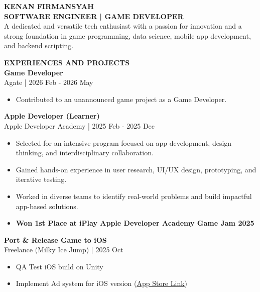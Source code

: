 \documentclass[11pt,a4paper]{article}
\newcommand{\mainsection}[1]{%
    {\large\bfseries\MakeUppercase{#1}}\\[8pt]%
}
\newcommand{\jobentry}[2]{%
    \textbf{#1}\\
    {\small\color{lighttext}#2}\\[4pt]%
}
\begin{document}
\begin{minipage}[t]{14cm}
\vspace{0.5cm}
\hspace{0.8cm}
\begin{minipage}[t]{12.5cm}

{\Huge\bfseries\MakeUppercase{Kenan Firmansyah}}\\[6pt]
{\large\bfseries SOFTWARE ENGINEER | GAME DEVELOPER}\\[12pt]

{\small A dedicated and versatile tech enthusiast with a passion for innovation and a strong foundation in game programming, data science, mobile app development, and backend scripting.}

\vspace{0.6cm}

\mainsection{Experiences and Projects}

\jobentry{Game Developer}{Agate | 2026 Feb - 2026 May}
\begin{itemize}[leftmargin=*, nosep, itemsep=2pt, topsep=2pt]
    \item Contributed to an unannounced game project as a Game Developer.
\end{itemize}

\vspace{0.5cm}

\jobentry{Apple Developer (Learner)}{Apple Developer Academy | 2025 Feb - 2025 Dec}
\begin{itemize}[leftmargin=*, nosep, itemsep=2pt, topsep=2pt]
    \item Selected for an intensive program focused on app development, design thinking, and interdisciplinary collaboration.
    \item Gained hands-on experience in user research, UI/UX design, prototyping, and iterative testing.
    \item Worked in diverse teams to identify real-world problems and build impactful app-based solutions.
    \item \textbf{Won 1st Place at iPlay Apple Developer Academy Game Jam 2025}
\end{itemize}

\vspace{0.5cm}

\jobentry{Port \& Release Game to iOS}{Freelance (Milky Ice Jump) | 2025 Oct}
\begin{itemize}[leftmargin=*, nosep, itemsep=2pt, topsep=2pt]
    \item QA Test iOS build on Unity
    \item Implement Ad system for iOS version (\href{https://apps.apple.com/id/app/milky-ice-jump/id6751799679}{\underline{App Store Link}})
\end{itemize}


\end{minipage}
\end{minipage}
\end{document}
